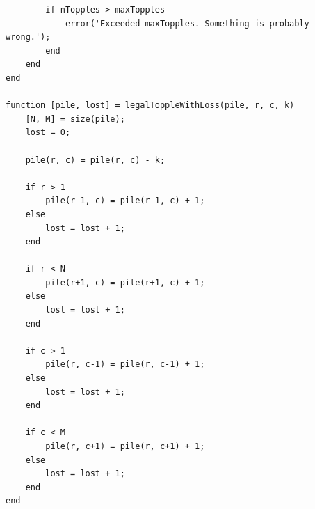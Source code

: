 \documentclass{article}
\begin{document}
\begin{lstlisting}
        if nTopples > maxTopples
            error('Exceeded maxTopples. Something is probably wrong.');
        end
    end
end

function [pile, lost] = legalToppleWithLoss(pile, r, c, k)
    [N, M] = size(pile);
    lost = 0;

    pile(r, c) = pile(r, c) - k;

    if r > 1
        pile(r-1, c) = pile(r-1, c) + 1;
    else
        lost = lost + 1;
    end

    if r < N
        pile(r+1, c) = pile(r+1, c) + 1;
    else
        lost = lost + 1;
    end

    if c > 1
        pile(r, c-1) = pile(r, c-1) + 1;
    else
        lost = lost + 1;
    end

    if c < M
        pile(r, c+1) = pile(r, c+1) + 1;
    else
        lost = lost + 1;
    end
end
\end{lstlisting}

\clearpage
\end{document}
